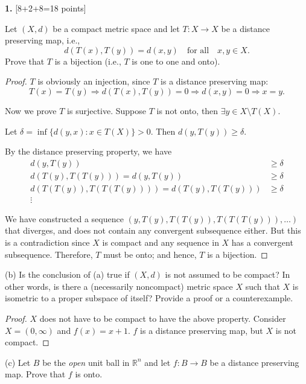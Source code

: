 \documentclass[11pt,a4paper]{amsart}
\def\R{{\mathbb R}}
\def\d{\delta}
\def\RA{\Rightarrow}
\def\ra{\rightarrow}
\begin{document}
\bigskip


{\bf 1.} [8+2+8=18 points]  

Let $(X,d)$ be a compact metric space and let $T:X\ra X$ be a distance preserving map,
i.e., 
$$ d(T(x),T(y))=d(x,y) \quad\mbox{for all}\quad x,y\in X. $$
Prove that $T$ is a bijection (i.e., $T$ is one to one and onto).


\begin{proof}
$T$ is obviously an injection, since $T$ is a distance preserving map:
$$ T(x) = T(y) \RA d(T(x), T(y)) = 0 \RA d(x,y)=0 \RA x=y. $$

Now we prove $T$ is surjective. 
Suppose $T$ is not onto, then $\exists y \in X \setminus T(X)$.

Let $\d=\inf\{d(y,x):x\in T(X)\}>0$. Then $ d(y, T(y)) \ge \d $.

By the distance preserving property, we have 
\begin{align*}
    d(y, T(y)) &\ge \d\\
    d(T(y), T(T(y))) = d(y, T(y)) &\ge \d \\
    d(T(T(y)), T(T(T(y)))) = d(T(y), T(T(y))) &\ge \d \\
    \vdots
\end{align*}

We have constructed a sequence $(y,T(y),T(T(y)),T(T(T(y))),\dots)$ that diverges, 
and does not contain any convergent subsequence either. 
But this is a contradiction since $X$ is compact and any sequence in $X$ has a 
convergent subsequence. 
Therefore, $T$ must be onto; and hence, $T$ is a bijection. 
\end{proof}
\medskip 

(b)  Is the conclusion of (a) true if $(X,d)$ is not assumed to be compact?
In other words, is there a (necessarily noncompact) metric space $X$ such that $X$ is isometric
to a proper subspace of itself?
Provide a proof or a counterexample.

\begin{proof}
$X$ does not have to be compact to have the above property. 
Consider $X = (0, \infty)$ and $f(x) = x + 1$. 
$f$ is a distance preserving map, but $X$ is not compact.
\end{proof}
\medskip

(c) Let $B$ be the \emph{open} unit ball in $\R^n$ and let $f:B\ra B$ be a distance preserving map. 
Prove that $f$ is onto. 
\end{document}
